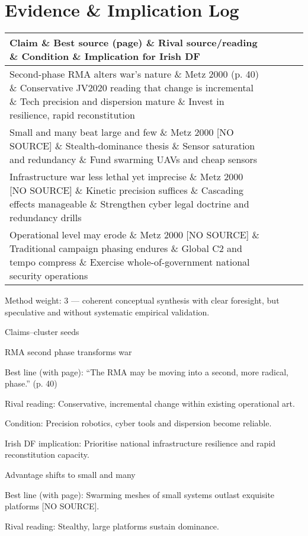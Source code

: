 \section*{Evidence \& Implication Log}
\begin{tabular}{p{3.2cm}p{4.2cm}p{3.6cm}p{3.2cm}p{4.2cm}}
	\textbf{Claim} \& \textbf{Best source (page)} \& \textbf{Rival source/reading} \& \textbf{Condition} \& \textbf{Implication for Irish DF}\\\hline
	Second-phase RMA alters war’s nature \& Metz 2000 (p. 40) \& Conservative JV2020 reading that change is incremental \& Tech precision and dispersion mature \& Invest in resilience, rapid reconstitution\\
	Small and many beat large and few \& Metz 2000 [NO SOURCE] \& Stealth-dominance thesis \& Sensor saturation and redundancy \& Fund swarming UAVs and cheap sensors\\
	Infrastructure war less lethal yet imprecise \& Metz 2000 [NO SOURCE] \& Kinetic precision suffices \& Cascading effects manageable \& Strengthen cyber legal doctrine and redundancy drills\\
	Operational level may erode \& Metz 2000 [NO SOURCE] \& Traditional campaign phasing endures \& Global C2 and tempo compress \& Exercise whole-of-government national security operations\\
\end{tabular}

Method weight: 3 — coherent conceptual synthesis with clear foresight, but speculative and without systematic empirical validation.

Claims–cluster seeds

RMA second phase transforms war

Best line (with page): “The RMA may be moving into a second, more radical, phase.” (p. 40)

Rival reading: Conservative, incremental change within existing operational art.

Condition: Precision robotics, cyber tools and dispersion become reliable.

Irish DF implication: Prioritise national infrastructure resilience and rapid reconstitution capacity.

Advantage shifts to small and many

Best line (with page): Swarming meshes of small systems outlast exquisite platforms [NO SOURCE].

Rival reading: Stealthy, large platforms sustain dominance.

